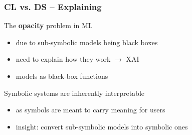 \documentclass[presentation]{beamer}\mode<presentation>{\usetheme{AMSBolognaFC}}
\begin{document}
\begin{frame}%
    \frametitle{CL vs. DS -- Explaining}

    \begin{block}{The \textbf{opacity} problem in ML}
        \begin{itemize}
            \item due to sub-symbolic models being black boxes
            \item need to \alert{explain} how they work $\rightarrow$ XAI
            \item models as black-box functions
        \end{itemize}
    \end{block}

    \begin{alertblock}{Symbolic systems are inherently interpretable}
        \begin{itemize}
            \item as symbols are meant to carry meaning for users
            \item insight: convert sub-symbolic models into symbolic ones
        \end{itemize}
    \end{alertblock}
\end{frame}
\end{document}
